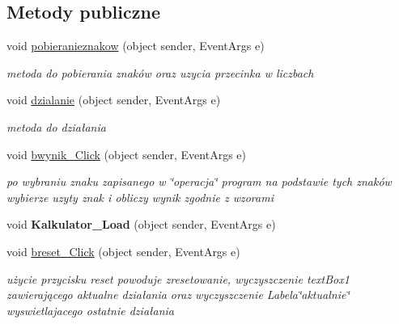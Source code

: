 \subsection*{Metody publiczne}
\begin{DoxyCompactItemize}
\item 
void \mbox{\hyperlink{classkalku__all__in__one_1_1_kalkulator_a3243bcd8324a673e6e5dfc012b057709}{pobieranieznakow}} (object sender, Event\+Args e)
\begin{DoxyCompactList}\small\item\em metoda do pobierania znaków oraz uzycia przecinka w liczbach \end{DoxyCompactList}\item 
void \mbox{\hyperlink{classkalku__all__in__one_1_1_kalkulator_ae6ecdb5e2624e2d7b85e40fbb72c71d0}{dzialanie}} (object sender, Event\+Args e)
\begin{DoxyCompactList}\small\item\em metoda do działania \end{DoxyCompactList}\item 
\mbox{\label{classkalku__all__in__one_1_1_kalkulator_ae31aba2077dde4cd5e33a4276c54cc01}} 
void \mbox{\hyperlink{classkalku__all__in__one_1_1_kalkulator_ae31aba2077dde4cd5e33a4276c54cc01}{bwynik\+\_\+\+Click}} (object sender, Event\+Args e)
\begin{DoxyCompactList}\small\item\em po wybraniu znaku zapisanego w \char`\"{}operacja\char`\"{} program na podstawie tych znaków wybierze uzyty znak i obliczy wynik zgodnie z wzorami \end{DoxyCompactList}\item 
\mbox{\label{classkalku__all__in__one_1_1_kalkulator_a08d2aa2740d65a5dbd471f53475f5c63}} 
void {\bfseries Kalkulator\+\_\+\+Load} (object sender, Event\+Args e)
\item 
\mbox{\label{classkalku__all__in__one_1_1_kalkulator_ae67c5089c8e37891bdbc6243122ff036}} 
void \mbox{\hyperlink{classkalku__all__in__one_1_1_kalkulator_ae67c5089c8e37891bdbc6243122ff036}{breset\+\_\+\+Click}} (object sender, Event\+Args e)
\begin{DoxyCompactList}\small\item\em użycie przycisku reset powoduje zresetowanie, wyczyszczenie text\+Box1 zawierającego aktualne działania oraz wyczyszczenie Labela\char`\"{}aktualnie\char`\"{} wyswietlajacego ostatnie działania \end{DoxyCompactList}\item 

\end{DoxyCompactItemize}
